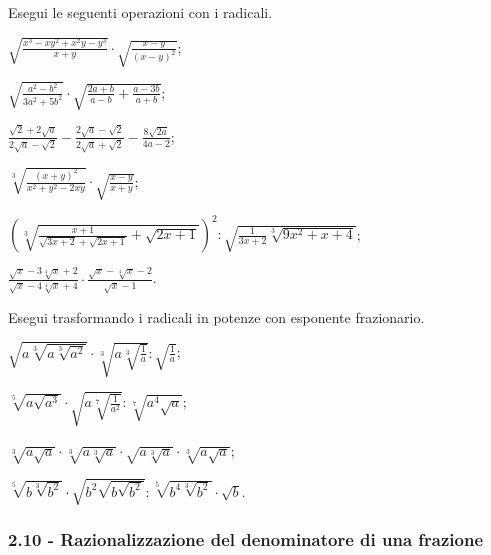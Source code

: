 \begin{esercizio}[\Ast]
 \label{ese:2.83}
Esegui le seguenti operazioni con i radicali.
 \begin{enumeratea}
 \item $\sqrt{\frac{x^{3}-xy^{2}+x^{2}y-y^{3}}{x+y}}\cdot\sqrt{\frac{x-y}{(x-y)^{2}}}$;
 \item $\sqrt{\frac{a^{2}-b^{2}}{3a^{2}+5b^{2}}}\cdot\sqrt{\frac{2a+b}{a-b}+\frac{a-3b}{a+b}}$;
 \item $\frac{\sqrt{2}+2\sqrt{a}}{2\sqrt{a}-\sqrt{2}}-\frac{2\sqrt{a}-\sqrt{2}}{2\sqrt{a}+\sqrt{2}}-\frac{8\sqrt{2a}}{4a-2}$;
 \item $\sqrt[3]{\frac{(x+y)^{2}}{x^{2}+y^{2}-2xy}}\cdot\sqrt{\frac{x-y}{x+y}}$;
 \item $\left(\sqrt[3]{\frac{x+1}{\sqrt{3x+2}+\sqrt{2x+1}}+\sqrt{2x+1}}\right)^{2}:\sqrt{\frac{1}{3x+2}\sqrt[3]{9x^{2}+x+4}}$;
 \item $\frac{\sqrt{x}-3\sqrt[4]{x}+2}{\sqrt{x}-4\sqrt[4]{x}+4}\cdot\frac{\sqrt{x}-\sqrt[4]{x}-2}{\sqrt{x}-1}$.
 \end{enumeratea}
\end{esercizio}

\begin{esercizio}[\Ast]
 \label{ese:2.84}
Esegui trasformando i radicali in potenze con esponente frazionario.
 \begin{multicols}{2}
 \begin{enumeratea}
 \item $\sqrt{a\sqrt[3]{a\sqrt[3]{a^2}}}\cdot \sqrt[3]{a\sqrt[3]{\frac 1 a}}:\sqrt{\frac 1 a}$;
 \item $\sqrt[5]{a\sqrt{a^3}}\cdot \sqrt{a\sqrt[7]{\frac 1{a^2}}}:\sqrt[7]{a^4\sqrt a}$;
 \item $\sqrt[3]{a\sqrt a}\cdot \sqrt[3]{a\sqrt[3]a}\cdot \sqrt{a\sqrt[3]a}\cdot \sqrt[3]{a\sqrt a}$;
 \item $\sqrt[5]{b\sqrt[3]{b^2}}\cdot \sqrt{b^2\sqrt{b\sqrt{b^2}}}:\sqrt[5]{b^4\sqrt[3]{b^2}}\cdot \sqrt b$.
 \end{enumeratea}
 \end{multicols}
\end{esercizio}

\subsubsection*{2.10 - Razionalizzazione del denominatore di una frazione}

